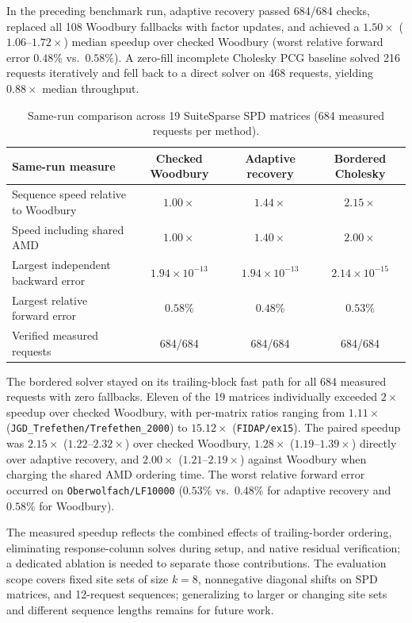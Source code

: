 \documentclass[10pt,letterpaper]{article}
\begin{document}
In the preceding benchmark run, adaptive recovery passed 684/684 checks, replaced all 108 Woodbury fallbacks with factor updates, and achieved a $1.50\times$ ($1.06\text{--}1.72\times$) median speedup over checked Woodbury (worst relative forward error $0.48\%$ vs.\ $0.58\%$). A zero-fill incomplete Cholesky PCG baseline solved 216 requests iteratively and fell back to a direct solver on 468 requests, yielding $0.88\times$ median throughput.

\begin{table}[ht]
\centering
\small
\caption{Same-run comparison across 19 SuiteSparse SPD matrices (684 measured requests per method).}
\label{tab:sparse}
\begin{tabularx}{\linewidth}{>{\raggedright\arraybackslash}Xccc}
\toprule
\textbf{Same-run measure} & \textbf{Checked Woodbury} & \textbf{Adaptive recovery} & \textbf{Bordered Cholesky} \\
\midrule
Sequence speed relative to Woodbury & $1.00\times$ & $1.44\times$ & $2.15\times$ \\
Speed including shared AMD & $1.00\times$ & $1.40\times$ & $2.00\times$ \\
Largest independent backward error & $1.94 \times 10^{-13}$ & $1.94 \times 10^{-13}$ & $2.14 \times 10^{-15}$ \\
Largest relative forward error & $0.58\%$ & $0.48\%$ & $0.53\%$ \\
Verified measured requests & 684/684 & 684/684 & 684/684 \\
\bottomrule
\end{tabularx}
\end{table}

The bordered solver stayed on its trailing-block fast path for all 684 measured requests with zero fallbacks. Eleven of the 19 matrices individually exceeded $2\times$ speedup over checked Woodbury, with per-matrix ratios ranging from $1.11\times$ (\texttt{JGD\_Trefethen/Trefethen\_2000}) to $15.12\times$ (\texttt{FIDAP/ex15}). The paired speedup was $2.15\times$ ($1.22\text{--}2.32\times$) over checked Woodbury, $1.28\times$ ($1.19\text{--}1.39\times$) directly over adaptive recovery, and $2.00\times$ ($1.21\text{--}2.19\times$) against Woodbury when charging the shared AMD ordering time. The worst relative forward error occurred on \texttt{Oberwolfach/LF10000} ($0.53\%$ vs.\ $0.48\%$ for adaptive recovery and $0.58\%$ for Woodbury).

The measured speedup reflects the combined effects of trailing-border ordering, eliminating response-column solves during setup, and native residual verification; a dedicated ablation is needed to separate those contributions. The evaluation scope covers fixed site sets of size $k = 8$, nonnegative diagonal shifts on SPD matrices, and 12-request sequences; generalizing to larger or changing site sets and different sequence lengths remains for future work.
\end{document}
